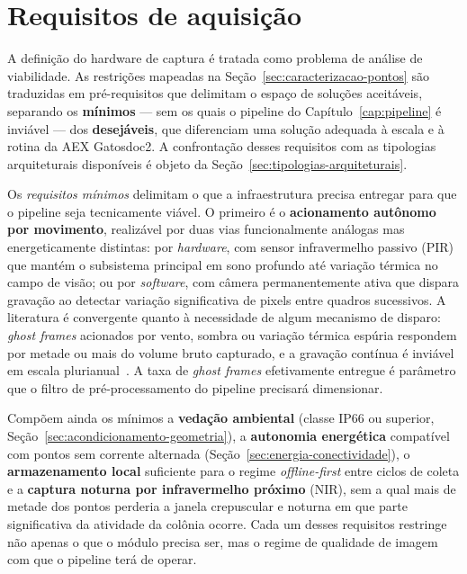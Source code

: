 \section{Requisitos de aquisição}
\label{sec:requisitos-tipologias}

A definição do hardware de captura é tratada como problema de análise de viabilidade. As restrições mapeadas na Seção~\ref{sec:caracterizacao-pontos} são traduzidas em pré-requisitos que delimitam o espaço de soluções aceitáveis, separando os \textbf{mínimos} --- sem os quais o pipeline do Capítulo~\ref{cap:pipeline} é inviável --- dos \textbf{desejáveis}, que diferenciam uma solução adequada à escala e à rotina da AEX Gatosdoc2. A confrontação desses requisitos com as tipologias arquiteturais disponíveis é objeto da Seção~\ref{sec:tipologias-arquiteturais}.

Os \emph{requisitos mínimos} delimitam o que a infraestrutura precisa entregar para que o pipeline seja tecnicamente viável. O primeiro é o \textbf{acionamento autônomo por movimento}, realizável por duas vias funcionalmente análogas mas energeticamente distintas: por \emph{hardware}, com sensor infravermelho passivo (PIR) que mantém o subsistema principal em sono profundo até variação térmica no campo de visão; ou por \emph{software}, com câmera permanentemente ativa que dispara gravação ao detectar variação significativa de pixels entre quadros sucessivos. A literatura é convergente quanto à necessidade de algum mecanismo de disparo: \emph{ghost frames} acionados por vento, sombra ou variação térmica espúria respondem por metade ou mais do volume bruto capturado, e a gravação contínua é inviável em escala plurianual~\cite{bruce2025largescale,velez2022choosing,swanson2015snapshot}. A taxa de \emph{ghost frames} efetivamente entregue é parâmetro que o filtro de pré-processamento do pipeline precisará dimensionar.

Compõem ainda os mínimos a \textbf{vedação ambiental} (classe IP66 ou superior, Seção~\ref{sec:acondicionamento-geometria}), a \textbf{autonomia energética} compatível com pontos sem corrente alternada (Seção~\ref{sec:energia-conectividade}), o \textbf{armazenamento local} suficiente para o regime \emph{offline-first} entre ciclos de coleta e a \textbf{captura noturna por infravermelho próximo} (NIR), sem a qual mais de metade dos pontos perderia a janela crepuscular e noturna em que parte significativa da atividade da colônia ocorre. Cada um desses requisitos restringe não apenas o que o módulo precisa ser, mas o regime de qualidade de imagem com que o pipeline terá de operar.

